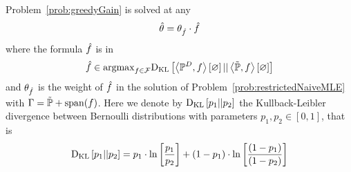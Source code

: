\begin{theorem}
    Problem~\eqref{prob:greedyGain} is solved at any
    \begin{align*}
        \hat{\theta} = \theta_{\hat{f}} \cdot \hat{f}
    \end{align*}
    where the formula $\hat{f}$ is in
    \begin{align*}
        \hat{f} \in \mathrm{argmax}_{f\in\mathcal{F}} \mathrm{D}_{\mathrm{KL}}\left[ \left\langle \mathbb{P}^{D},f\right\rangle \left[ \varnothing \right] || \left\langle \tilde{\mathbb{P}},f\right\rangle \left[ \varnothing \right] \right]
    \end{align*}
    and $\theta_{\hat{f}}$ is the weight of $\hat{f}$ in the solution of Problem~\ref{prob:restrictedNaiveMLE} with $\Gamma = \tilde{\mathbb{P}} + \mathrm{span}(f)$.
    Here we denote by $\mathrm{D}_{\mathrm{KL}}\left[ p_1 || p_2 \right]$ the Kullback-Leibler divergence between Bernoulli distributions with parameters $p_1,p_2\in[0,1]$, that is
    \[ \mathrm{D}_{\mathrm{KL}}\left[ p_1 || p_2 \right] = p_1 \cdot \ln \left[ \frac{p_1}{p_2} \right] + (1-p_1) \cdot \ln \left[ \frac{(1-p_1)}{(1-p_2)} \right]  \]
\end{theorem}

